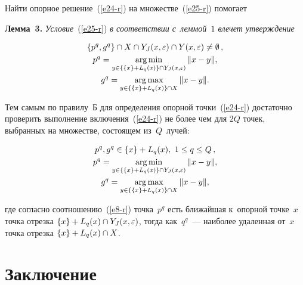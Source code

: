 \begin{multicols}{2}
  Найти опорное решение~(\ref{e24-r}) на множестве~(\ref{e25-r}) помогает
  
  \smallskip
  
  \noindent
  \textbf{Лемма~3.} \textit{Условие}~(\ref{e25-r}) \textit{в соответствии 
с~леммой~$1$ влечет утверждение}

\vspace*{-6pt}

\noindent
  \begin{multline*}
  \left\{ p^q,g^q\right\}\cap X\cap Y_J(x,\varepsilon)\cap 
Y(x,\varepsilon)\not=\emptyset\,,\\
  p^q=\mathop{\mathrm{arg}\,\mathrm{min}}\limits_{y\in \{\{x\}+L_q(x)\} \cap Y_J(x,\varepsilon)} \| x-
y\|,\\
  g^q=\mathop{\mathrm{arg}\,\mathrm{max}}\limits_{y\in\{\{x\}+L_q(x)\}\cap X} \| x-y\|.
  \end{multline*}
  
  \vspace*{-4pt}
  
  Тем самым по правилу~Б для определения опорной точки~(\ref{e24-r}) 
достаточно проверить выполнение включения~(\ref{e24-r}) не более чем для 
$2Q$ точек, выбранных на множестве, состоящем из~$Q$~лучей:

\vspace*{-6pt}

\noindent
\begin{multline}
   p^q,g^q \in \{x\}+L_q(x),\ 1\leq q\leq Q\,,\\
  p^q=\mathop{\mathrm{arg}\,\mathrm{min}}\limits_{y\in \{\{x\}+L_q(x)\} \cap Y_J(x,\varepsilon)} \| x-
y\|,\\
  g^q=\mathop{\mathrm{arg}\,\mathrm{max}}\limits_{y\in\{\{x\}+L_q(x)\}\cap X} \| x-y\|,
  \label{e27-r}
  \end{multline}
  
  \vspace*{-4pt}
  
  \noindent
где согласно соотношению~(\ref{e8-r}) точка~$p^q$ есть ближайшая 
к~опорной точке~$x$ точка отрезка $\{x\}\hm+ L_q(x)\cap 
Y_J(x,\varepsilon)$, тогда как~$q^q$~--- наиболее удаленная от~$x$ точка 
отрезка $\{x\} \hm+ L_q(x)\cap X$.

\vspace*{-9pt}

\section{Заключение}


\end{multicols}
